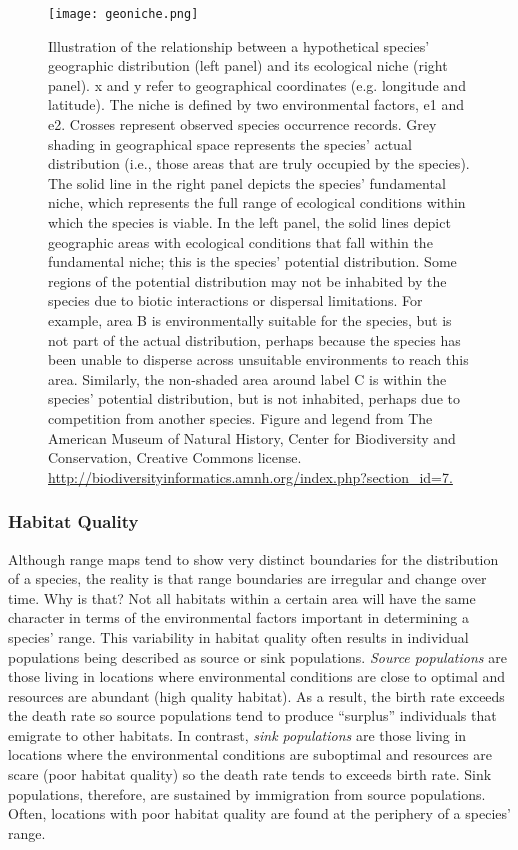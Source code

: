 \documentclass[11pt, hidelinks]{article}
\begin{document}
\begin{figure}
	\centering
	\texttt{[image: geoniche.png]}
	\caption{Illustration of the relationship between a hypothetical species' geographic distribution (left panel) and its ecological niche (right panel).  x and y refer to geographical coordinates (e.g. longitude and latitude). The niche is defined by two environmental factors, e1 and e2. Crosses represent observed species occurrence records. Grey shading in geographical space represents the species' actual distribution (i.e., those areas that are truly occupied by the species). The solid line in the right panel depicts the species' fundamental niche, which represents the full range of ecological conditions within which the species is viable. In the left panel, the solid lines depict geographic areas with ecological conditions that fall within the fundamental niche; this is the species' potential distribution. Some regions of the potential distribution may not be inhabited by the species due to biotic interactions or dispersal limitations. For example, area B is environmentally suitable for the species, but is not part of the actual distribution, perhaps because the species has been unable to disperse across unsuitable environments to reach this area. Similarly, the non-shaded area around label C is within the species' potential distribution, but is not inhabited, perhaps due to competition from another species. Figure and legend from The American Museum of Natural History, Center for Biodiversity and Conservation, Creative Commons license. \url{http://biodiversityinformatics.amnh.org/index.php?section_id=7.}\label{geoniche}}
\end{figure}

\subsubsection{Habitat Quality}

Although range maps tend to show very distinct boundaries for the distribution of a species, the reality is that range boundaries are irregular and change over time.  Why is that?  Not all habitats within a certain area will have the same character in terms of the environmental factors important in determining a species' range. This variability in habitat quality often results in individual populations being described as source or sink populations. \emph{Source populations} are those living in locations where environmental conditions are close to optimal and resources are abundant (high quality habitat).  As a result, the birth rate exceeds the death rate so source populations tend to produce ``surplus'' individuals that emigrate to other habitats. In contrast, \emph{sink populations} are those living in locations where the environmental conditions are suboptimal and resources are scare (poor habitat quality) so the death rate tends to exceeds birth rate. Sink populations, therefore, are sustained by immigration from source populations. Often, locations with poor habitat quality are found at the periphery of a species' range.  
\end{document}
